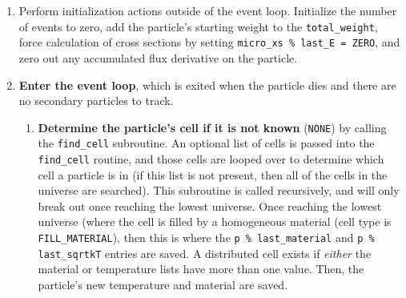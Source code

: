 \documentclass[10pt]{article}
\numberwithin{equation}{section} %
\begin{document}
\begin{enumerate}
	\begin{enumerate}
	\item Perform initialization actions outside of the event loop. Initialize the number of events to zero, add the particle's starting weight to the {\tt total\_weight}, force calculation of cross sections by setting {\tt micro\_xs \% last\_E = ZERO}, and zero out any accumulated flux derivative on the particle. 
	\item {\bf Enter the event loop}, which is exited when the particle dies and there are no secondary particles to track.
		\begin{enumerate}
		\item {\bf Determine the particle's cell if it is not known} ({\tt NONE}) by calling the {\tt find\_cell} subroutine. An optional list of cells is passed into the {\tt find\_cell} routine, and those cells are looped over to determine which cell a particle is in (if this list is not present, then all of the cells in the universe are searched). This subroutine is called recursively, and will only break out once reaching the lowest universe. Once reaching the lowest universe (where the cell is filled by a homogeneous material (cell type is {\tt FILL\_MATERIAL}), then this is where the {\tt p \% last\_material} and {\tt p \% last\_sqrtkT} entries are saved. A distributed cell exists if {\it either} the material or temperature lists have more than one value. Then, the particle's new temperature and material are saved.
				
		\begin{algorithm}[H]
				\end{algorithm}
				

\end{enumerate}
\end{enumerate}
\end{enumerate}
\end{document}
